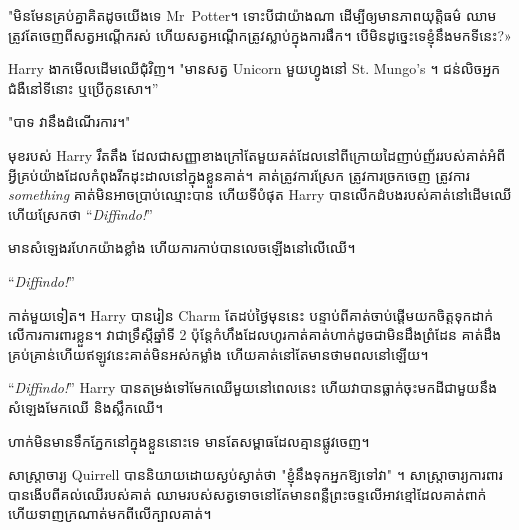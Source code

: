 "មិនមែនគ្រប់គ្នាគិតដូចយើងទេ Mr~Potter។ ទោះ​បី​ជា​យ៉ាង​ណា ដើម្បី​ឲ្យ​មាន​ភាព​យុត្តិធម៌ ឈាម​ត្រូវ​តែ​ចេញ​ពី​សត្វ​អណ្តើក​រស់ ហើយ​សត្វ​អណ្តើក​ត្រូវ​ស្លាប់​ក្នុង​ការ​ផឹក។ បើ​មិន​ដូច្នេះ​ទេ​ខ្ញុំ​នឹង​មក​ទី​នេះ?»

Harry ងាកមើលដើមឈើជុំវិញ។ "មានសត្វ Unicorn មួយហ្វូងនៅ St. Mungo's ។ ជន់លិចអ្នកជំងឺនៅទីនោះ ឬប្រើកូនសោ។”

"បាទ វានឹងដំណើរការ។"

មុខរបស់ Harry រឹតតឹង ដែលជាសញ្ញាខាងក្រៅតែមួយគត់ដែលនៅពីក្រោយដៃញាប់ញ័ររបស់គាត់អំពីអ្វីគ្រប់យ៉ាងដែលកំពុងរីកដុះដាលនៅក្នុងខ្លួនគាត់។ គាត់​ត្រូវ​ការ​ស្រែក ត្រូវការ​ច្រកចេញ ត្រូវការ \emph{something} គាត់​មិន​អាច​ប្រាប់​ឈ្មោះ​បាន ហើយ​ទីបំផុត Harry បាន​លើក​ដំបង​របស់គាត់​នៅ​ដើមឈើ ហើយ​ស្រែកថា “\emph{Diffindo!}”

មាន​សំឡេង​រហែក​យ៉ាង​ខ្លាំង ហើយ​ការ​កាប់​បាន​លេច​ឡើង​នៅ​លើ​ឈើ។

“\emph{Diffindo!}”

កាត់មួយទៀត។ Harry បានរៀន Charm តែដប់ថ្ងៃមុននេះ បន្ទាប់ពីគាត់ចាប់ផ្តើមយកចិត្តទុកដាក់លើការការពារខ្លួន។ វាជាទ្រឹស្ដីឆ្នាំទី 2 ប៉ុន្តែកំហឹងដែលហូរកាត់គាត់ហាក់ដូចជាមិនដឹងព្រំដែន គាត់ដឹងគ្រប់គ្រាន់ហើយឥឡូវនេះគាត់មិនអស់កម្លាំង ហើយគាត់នៅតែមានថាមពលនៅឡើយ។

“\emph{Diffindo!}” Harry បានតម្រង់ទៅមែកឈើមួយនៅពេលនេះ ហើយវាបានធ្លាក់ចុះមកដីជាមួយនឹងសំឡេងមែកឈើ និងស្លឹកឈើ។

ហាក់​មិន​មាន​ទឹក​ភ្នែក​នៅ​ក្នុង​ខ្លួន​នោះ​ទេ មាន​តែ​សម្ពាធ​ដែល​គ្មាន​ផ្លូវ​ចេញ។

សាស្ត្រាចារ្យ Quirrell បាននិយាយដោយស្ងប់ស្ងាត់ថា "ខ្ញុំនឹងទុកអ្នកឱ្យទៅវា" ។ សាស្ត្រាចារ្យ​ការពារ​បាន​ងើប​ពី​គល់​ឈើ​របស់​គាត់ ឈាម​របស់​សត្វ​ទោច​នៅ​តែ​មាន​ពន្លឺ​ព្រះចន្ទ​លើ​អាវ​ខ្មៅ​ដែល​គាត់​ពាក់ ហើយ​ទាញ​ក្រណាត់​មក​ពី​លើ​ក្បាល​គាត់។

